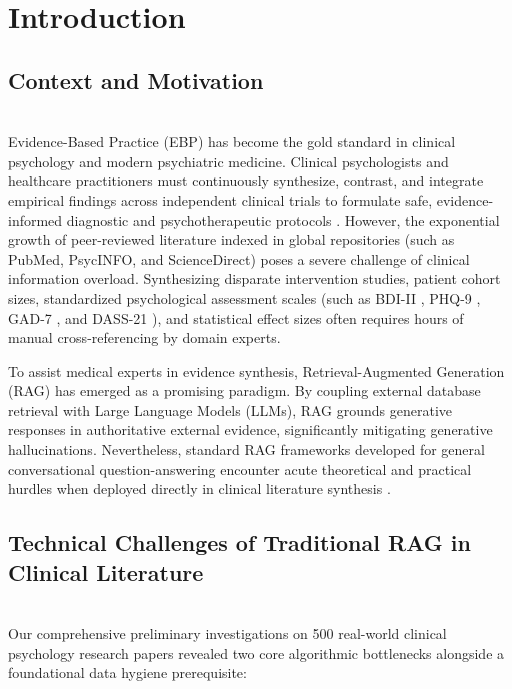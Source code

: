 \documentclass[10pt]{SPIIRAS_Proceedings}
\begin{document}
\makeengtitle

\normalsize
\raggedbottom

\section{Introduction}

\subsection{Context and Motivation}~\\
\hspace*{\parindent}Evidence-Based Practice (EBP) \cite{sackett1996evidence} has become the gold standard in clinical psychology and modern psychiatric medicine. Clinical psychologists and healthcare practitioners must continuously synthesize, contrast, and integrate empirical findings across independent clinical trials to formulate safe, evidence-informed diagnostic and psychotherapeutic protocols \cite{moher2009preferred}. However, the exponential growth of peer-reviewed literature indexed in global repositories (such as PubMed, PsycINFO, and ScienceDirect) poses a severe challenge of clinical information overload. Synthesizing disparate intervention studies, patient cohort sizes, standardized psychological assessment scales (such as BDI-II \cite{beck1996manual}, PHQ-9 \cite{kroenke2001phq}, GAD-7 \cite{spitzer2006brief}, and DASS-21 \cite{lovibond1995structure}), and statistical effect sizes \cite{cohen1988statistical} often requires hours of manual cross-referencing by domain experts.

To assist medical experts in evidence synthesis, Retrieval-Augmented Generation (RAG) \cite{lewis2020retrieval} has emerged as a promising paradigm. By coupling external database retrieval with Large Language Models (LLMs), RAG grounds generative responses in authoritative external evidence, significantly mitigating generative hallucinations. Nevertheless, standard RAG frameworks developed for general conversational question-answering encounter acute theoretical and practical hurdles when deployed directly in clinical literature synthesis \cite{gao2024modular}.

\subsection{Technical Challenges of Traditional RAG in Clinical Literature}~\\
\hspace*{\parindent}Our comprehensive preliminary investigations on 500 real-world clinical psychology research papers revealed two core algorithmic bottlenecks alongside a foundational data hygiene prerequisite:
\end{document}
